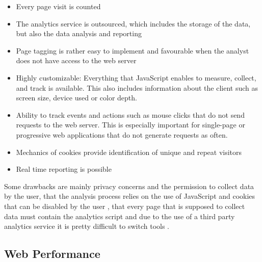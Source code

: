 \begin{itemize}
\item Every page visit is counted %
\item The analytics service is outsourced, which includes the storage of the data, but also the data analysis and reporting %
\item Page tagging is rather easy to implement and favourable when the analyst does not have access to the web server %
\item Highly customizable: Everything that JavaScript enables to measure, collect, and track is available. This also includes information about the client such as screen size, device used or color depth. %
\item Ability to track events and actions such as mouse clicks that do not send requests to the web server. This is especially important for single-page or progressive web applications that do not generate requests as often.  %
\item Mechanics of cookies provide identification of unique and repeat visitors %
\item Real time reporting is possible %
\end{itemize}


Some drawbacks are mainly privacy concerns and the permission to collect data by the user,  that the analysis process relies on the use of JavaScript and cookies that can be disabled by the user \cite{2011Marek}, that every page that is supposed to collect data must contain the analytics script and due to the use of a third party analytics service it is pretty difficult to switch tools \cite{2014Singal}.















\subsection{Web Performance}
\label{chapter:web_performance}



